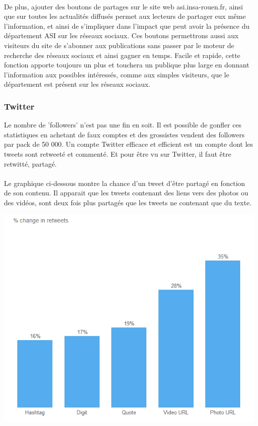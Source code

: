 \paragraph{}
De plus, ajouter des boutons de partages sur le site web asi.insa-rouen.fr, ainsi que sur toutes les actualités diffusés permet aux lecteurs de partager eux même l'information, et ainsi de s'impliquer dans l'impact que peut avoir la présence du département ASI sur les réseaux sociaux. Ces boutons permettrons aussi aux visiteurs du site de s'abonner aux publications sans passer par le moteur de recherche des réseaux sociaux et ainsi gagner en temps. Facile et rapide, cette fonction apporte toujours un plus et touchera un publique plus large en donnant l'information aux possibles intéressés, comme aux simples visiteurs, que le département est présent sur les réseaux sociaux.
\subsubsection{Twitter}
Le nombre de 'followers' n'est pas une fin en soit. Il est possible de gonfler ces statistiques en achetant de faux comptes et des grossistes vendent des followers par pack de 50 000. Un compte Twitter efficace et efficient est un compte dont les tweets sont retweeté et commenté. Et pour être vu sur Twitter, il faut être retwitté, partagé.
\paragraph{}
Le graphique ci-dessous montre la chance d'un tweet d'être partagé en fonction de son contenu. Il apparait que les tweets contenant des liens vers des photos ou des vidéos, sont deux fois plus partagés que les tweets ne contenant que du texte.
\begin{center}
\includegraphics[scale=0.5]{./image/retweet.png}
\end{center}

